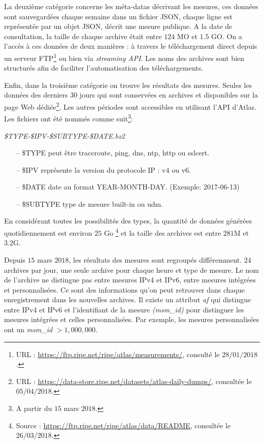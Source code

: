 La deuxième catégorie concerne  les  méta-datas  décrivant les mesures,  ces données sont sauvegardées chaque semaine dans un fichier JSON, chaque  ligne est représentée par un objet JSON, décrit une mesure publique. A la date de  consultation, la taille de chaque archive était entre $124$ MO et $1.5$ GO. On a l'accès à ces   données  de deux manières : à travers le téléchargement direct depuis un serveur FTP\footnote{URL : \url{https://ftp.ripe.net/ripe/atlas/measurements/}, consulté le $ 28/01/2018 $. } ou bien via \textit{streaming API}. Les noms des archives sont bien structurés afin de faciliter l'automatisation des téléchargements.

Enfin, dans la troisième catégorie on trouve les résultats des mesures.
Seules les données des derniers $30$ jours qui sont conservées en archives et disponibles sur la page Web dédiée\footnote{URL : \url{https://data-store.ripe.net/datasets/atlas-daily-dumps/}, consultée le $05/04/2018$.}. Les autres périodes sont accessibles en utilisant l'API d'Atlas.
Les fichiers ont été nommés  comme suit\footnote{A partir du $ 15 $ mars $ 2018 $.}: 

\begin{tcolorbox}
	\begin{center}
		\textit{\$TYPE-\$IPV-\$SUBTYPE-\$DATE.bz2}
	\end{center}
\end{tcolorbox}

\begin{itemize}
	\item[--] \$TYPE peut être {traceroute, ping, dns, ntp, http ou sslcert}.
	\item[--] \$IPV  représente la version du protocole IP : v4 ou v6.
	\item[--] \$DATE date au format  YEAR-MONTH-DAY. (Exemple: 2017-06-13)
	\item[--] \$SUBTYPE type de mesure built-in ou udm.
\end{itemize}

En considérant toutes les possibilités des types, la quantité de données générées quotidiennement est environ $25$ Go \footnote{Source :  \url{https://ftp.ripe.net/ripe/atlas/data/README}, consultée le $26/03/2018$.}    et la taille des  archives est entre $281$M et $3.2$G.

Depuis $15$ mars $2018$, les résultats des mesures sont  regroupés différemment. $24$ archives par jour,  une seule archive pour chaque heure et  type de mesure. Le nom de l'archive ne distingue pas entre mesures IPv4 et IPv6,  entre mesures intégrées et  personnalisées. Ce sont des informations qu'on peut retrouver dans chaque enregistrement dans les nouvelles archives. Il existe un attribut \textit{af} qui distingue entre IPv4 et IPv6 et l'identifiant de la mesure \textit{(msm\_id)} pour distinguer les  mesures intégrées et celles personnalisées. Par exemple, les mesures personnalisées ont un \textit{msm\_id} $ > 1,000,000$. 

